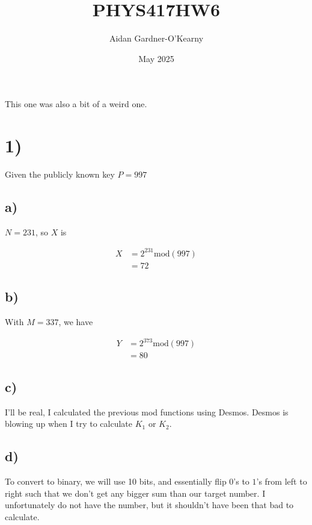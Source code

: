 \documentclass{article}
\title{PHYS417HW6}
\author{Aidan Gardner-O'Kearny}
\date{May 2025}
\begin{document}
\maketitle

This one was also a bit of a weird one.

\section*{1)}

Given the publicly known key $P=997$

\subsection*{a)}
$N=231$, so $X$ is

\begin{align*}
    X&=2^{231}\text{mod}(997)\\[1em]
    &=72
\end{align*}

\subsection*{b)}
With $M=337$, we have

\begin{align*}
    Y&=2^{373}\text{mod}(997)\\[1em]
    &=80
\end{align*}


\subsection*{c)}


I'll be real, I calculated the previous mod functions using Desmos. Desmos is blowing up when I try to calculate $K_1$ or $K_2$.

\subsection*{d)}
To convert to binary, we will use 10 bits, and essentially flip $0$'s to $1$'s from left to right such that we don't get any bigger sum than our target number. I unfortunately do not have the number, but it shouldn't have been that bad to calculate.
\end{document}
